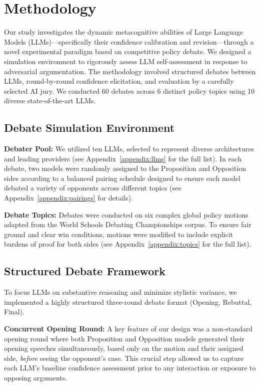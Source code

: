 \documentclass{article}
\begin{document}
\section{Methodology}
\label{sec:methodology}

Our study investigates the dynamic metacognitive abilities of Large Language Models (LLMs)---specifically their confidence calibration and revision---through a novel experimental paradigm based on competitive policy debate. We designed a simulation environment to rigorously assess LLM self-assessment in response to adversarial argumentation. The methodology involved structured debates between LLMs, round-by-round confidence elicitation, and evaluation by a carefully selected AI jury. We conducted 60 debates across 6 distinct policy topics using 10 diverse state-of-the-art LLMs.

\subsection{Debate Simulation Environment}
\label{subsec:debate_env}

\textbf{Debater Pool:} We utilized ten LLMs, selected to represent diverse architectures and leading providers (see Appendix~\ref{appendix:llms} for the full list). In each debate, two models were randomly assigned to the Proposition and Opposition sides according to a balanced pairing schedule designed to ensure each model debated a variety of opponents across different topics (see Appendix~\ref{appendix:pairings} for details).

\textbf{Debate Topics:} Debates were conducted on six complex global policy motions adapted from the World Schools Debating Championships corpus. To ensure fair ground and clear win conditions, motions were modified to include explicit burdens of proof for both sides (see Appendix~\ref{appendix:topics} for the full list).

\subsection{Structured Debate Framework}
\label{subsec:debate_framework}

To focus LLMs on substantive reasoning and minimize stylistic variance, we implemented a highly structured three-round debate format (Opening, Rebuttal, Final).

\textbf{Concurrent Opening Round:} A key feature of our design was a non-standard opening round where both Proposition and Opposition models generated their opening speeches simultaneously, based only on the motion and their assigned side, \textit{before} seeing the opponent's case. This crucial step allowed us to capture each LLM's baseline confidence assessment prior to any interaction or exposure to opposing arguments.
\end{document}
